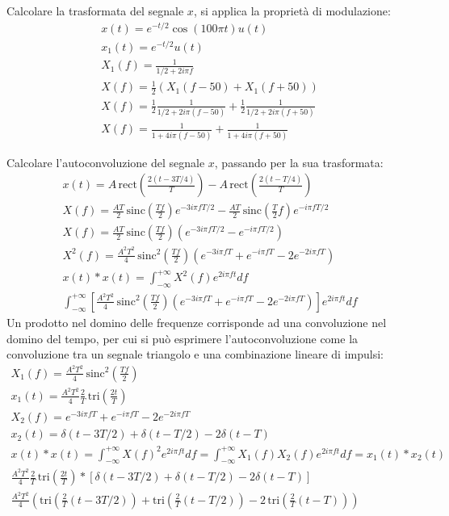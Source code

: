 \documentclass{article}
\numberwithin{equation}{subsection}
\begin{document}
Calcolare la trasformata del segnale $x$, si applica la proprietà di modulazione: 
\begin{gather*}
    x(t)=e^{-t/2}\cos(100\pi t)u(t)\\
    x_1(t)=e^{-t/2}u(t)\\
    X_1(f)=\displaystyle\frac{1}{1/2+2i\pi f}\\
    X(f)=\displaystyle\frac{1}{2}\left(X_1(f-50)+X_1(f+50)\right)\\
    X(f)=\displaystyle\frac{1}{2}\frac{1}{1/2+2i\pi (f-50)}+\frac{1}{2}\frac{1}{1/2+2i\pi (f+50)}\\
    X(f)=\displaystyle\frac{1}{1+4i\pi (f-50)}+\frac{1}{1+4i\pi (f+50)}
\end{gather*}


Calcolare l'autoconvoluzione del segnale $x$, passando per la sua trasformata: 
\begin{gather*}
    x(t)=A\,\mbox{rect}\displaystyle\left(\frac{2(t-3T/4)}{T}\right)-A\,\mbox{rect}\displaystyle\left(\frac{2(t-T/4)}{T}\right)\\
    X(f)=\displaystyle\frac{AT}{2}\,\mbox{sinc}\left(\frac{Tf}{2}\right)e^{-3i\pi fT/2}-\displaystyle\frac{AT}{2}\,\mbox{sinc}\left(\frac{T}{2}f\right)e^{-i\pi fT/2}\\
    X(f)=\displaystyle\frac{AT}{2}\,\mbox{sinc}\left(\frac{Tf}{2}\right)\left(e^{-3i\pi fT/2}-e^{-i\pi fT/2}\right)\\
    X^2(f)=\displaystyle\frac{A^2T^2}{4}\,\mbox{sinc}^2\left(\frac{Tf}{2}\right)\left(e^{-3i\pi fT}+e^{-i\pi fT}-2e^{-2i\pi fT}\right)\\
    x(t)*x(t)=\displaystyle\int_{-\infty}^{+\infty}X^2(f)e^{2i\pi ft}df\\
    \displaystyle\int_{-\infty}^{+\infty}\left[\frac{A^2T^2}{4}\,\mbox{sinc}^2\left(\frac{Tf}{2}\right)\left(e^{-3i\pi fT}+e^{-i\pi fT}-2e^{-2i\pi fT}\right)\right]e^{2i\pi ft}df
\end{gather*}
Un prodotto nel domino delle frequenze corrisponde ad una convoluzione nel domino del tempo, per cui si può esprimere l'autoconvoluzione come la convoluzione tra un segnale 
triangolo e una combinazione lineare di impulsi:
\begin{gather*}
    X_1(f)=\displaystyle\frac{A^2T^2}{4}\,\mbox{sinc}^2\left(\frac{Tf}{2}\right)\\
    x_1(t)=\displaystyle\frac{A^2T^2}{4}\frac{2}{T}\,\mbox{tri}\left(\frac{2t}{T}\right)\\
    X_2(f)=e^{-3i\pi fT}+e^{-i\pi fT}-2e^{-2i\pi fT}\\
    x_2(t)=\delta(t-3T/2)+\delta(t-T/2)-2\delta(t-T)\\
    x(t)*x(t)=\displaystyle\int_{-\infty}^{+\infty}X(f)^2e^{2i\pi ft}df=\int_{-\infty}^{+\infty}X_1(f)X_2(f)e^{2i\pi ft}df=x_1(t)*x_2(t)\\
    \displaystyle\frac{A^2T^2}{4}\frac{2}{T}\,\mbox{tri}\left(\frac{2t}{T}\right)*\left[\delta(t-3T/2)+\delta(t-T/2)-2\delta(t-T)\right]\\
    \displaystyle\frac{A^2T^2}{4}\left(\mbox{tri}\left(\frac{2}{T}(t-3T/2)\right)+\mbox{tri}\left(\frac{2}{T}(t-T/2)\right)-2\,\mbox{tri}\left(\frac{2}{T}(t-T)\right)\right)
\end{gather*}
\end{document}
